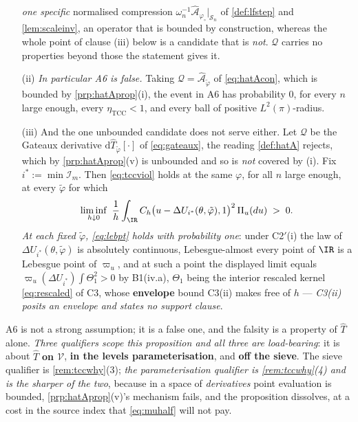 \begin{proposition}
\begin{enumerate}
\emph{one specific} normalised compression
$\omega_n^{-1}\hat{\mathcal A}_{\varphi_\circ}\vert_{\mathcal S_n}$ of \cref{def:lfstep} and
\cref{lem:scaleinv}, an operator that is bounded by construction, whereas the whole point of clause
(iii) below is a candidate that is \emph{not}. $\mathcal Q$ carries no properties beyond those the
statement gives it.
\item[(ii)] \emph{In particular A6 is false.} Taking $\mathcal Q=\hat{\mathcal A}_{\tilde\varphi}$ of
\eqref{eq:hatAcon}, which is bounded by \cref{prp:hatAprop}(i), the event in A6 has probability $0$, 
for every $n$ large enough, every $\eta_{\mathrm{TCC}}<1$, and every ball of positive
$L^{2}(\pi)$-radius.
\item[(iii)] And the one unbounded candidate does not serve either. Let $\mathcal Q$ be the
Gateaux derivative $\mathrm d\hat T_{\tilde\varphi}[\cdot]$ of \eqref{eq:gateaux}, the reading
\cref{def:hatA} rejects, which by \cref{prp:hatAprop}(v) is unbounded and so is \emph{not} covered by
(i). Fix $i^\ast:=\min\mathcal I_m$. Then \eqref{eq:tccviol} holds at the same $\varphi$, for all $n$
large enough, at every $\tilde\varphi$ for which
\begin{equation}\label{eq:lebpt}
\liminf_{h\downarrow0}\ \frac1h\int_{\IR}C_{h}\big(u-\Delta U_{i^\ast}(\theta,\tilde\varphi),1\big)^{2}\,
\Pi_u(du)\;>\;0 .
\end{equation}
\emph{At each fixed $\tilde\varphi$, \eqref{eq:lebpt} holds with probability one}: under C2$'$(i)
the law of $\Delta U_{i^\ast}(\theta,\tilde\varphi)$ is absolutely continuous, Lebesgue-almost every
point of $\IR$ is a Lebesgue point of $\varpi_u$, and at such a point the displayed limit equals
$\varpi_u(\Delta U_{i^\ast})\int\Theta_1^{2}>0$ by B1(iv.a), $\Theta_1$ being the interior rescaled
kernel \eqref{eq:rescaled} of C3, whose \textbf{envelope} bound C3(ii) makes free of $h$ --- \emph{C3(ii)
posits an envelope and states no support clause}.
\end{enumerate}
A6 is not a strong assumption; it is a false one, and the falsity is a property of $\hat T$
alone.
\emph{Three qualifiers scope this proposition and all three are load-bearing}: it is about $\hat T$
\textbf{on $\mathcal V$}, \textbf{in the levels parameterisation}, and \textbf{off the sieve}. The sieve
qualifier is \cref{rem:tccwhy}\textup{(3)}; \emph{the parameterisation qualifier is
\cref{rem:tccwhy}\textup{(4)} and is the sharper of the two}, because in a space of \emph{derivatives} point
evaluation is bounded, \cref{prp:hatAprop}(v)'s mechanism fails, and the proposition dissolves, at a cost
in the source index that \eqref{eq:muhalf} will not pay.
\end{proposition}

